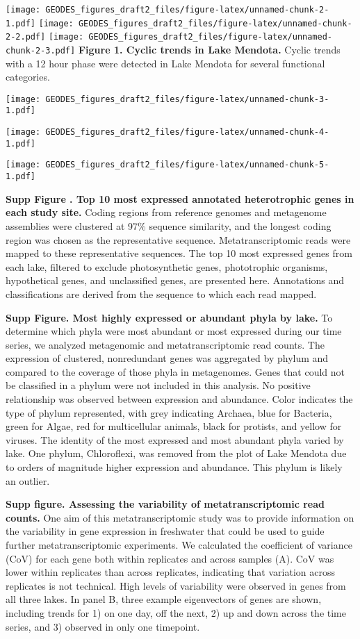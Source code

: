 \documentclass[]{article}
\begin{document}
\texttt{[image: GEODES\_figures\_draft2\_files/figure-latex/unnamed-chunk-2-1.pdf]}
\texttt{[image: GEODES\_figures\_draft2\_files/figure-latex/unnamed-chunk-2-2.pdf]}
\texttt{[image: GEODES\_figures\_draft2\_files/figure-latex/unnamed-chunk-2-3.pdf]}
\textbf{Figure 1. Cyclic trends in Lake Mendota.} Cyclic trends with a
12 hour phase were detected in Lake Mendota for several functional
categories.

\texttt{[image: GEODES\_figures\_draft2\_files/figure-latex/unnamed-chunk-3-1.pdf]}

\texttt{[image: GEODES\_figures\_draft2\_files/figure-latex/unnamed-chunk-4-1.pdf]}

\texttt{[image: GEODES\_figures\_draft2\_files/figure-latex/unnamed-chunk-5-1.pdf]}

\textbf{Supp Figure . Top 10 most expressed annotated heterotrophic
genes in each study site.} Coding regions from reference genomes and
metagenome assemblies were clustered at 97\% sequence similarity, and
the longest coding region was chosen as the representative sequence.
Metatranscriptomic reads were mapped to these representative sequences.
The top 10 most expressed genes from each lake, filtered to exclude
photosynthetic genes, phototrophic organisms, hypothetical genes, and
unclassified genes, are presented here. Annotations and classifications
are derived from the sequence to which each read mapped.

\textbf{Supp Figure. Most highly expressed or abundant phyla by lake.}
To determine which phyla were most abundant or most expressed during our
time series, we analyzed metagenomic and metatranscriptomic read counts.
The expression of clustered, nonredundant genes was aggregated by phylum
and compared to the coverage of those phyla in metagenomes. Genes that
could not be classified in a phylum were not included in this analysis.
No positive relationship was observed between expression and abundance.
Color indicates the type of phylum represented, with grey indicating
Archaea, blue for Bacteria, green for Algae, red for multicellular
animals, black for protists, and yellow for viruses. The identity of the
most expressed and most abundant phyla varied by lake. One phylum,
Chloroflexi, was removed from the plot of Lake Mendota due to orders of
magnitude higher expression and abundance. This phylum is likely an
outlier.

\textbf{Supp figure. Assessing the variability of metatranscriptomic
read counts.} One aim of this metatranscriptomic study was to provide
information on the variability in gene expression in freshwater that
could be used to guide further metatranscriptomic experiments. We
calculated the coefficient of variance (CoV) for each gene both within
replicates and across samples (A). CoV was lower within replicates than
across replicates, indicating that variation across replicates is not
technical. High levels of variability were observed in genes from all
three lakes. In panel B, three example eigenvectors of genes are shown,
including trends for 1) on one day, off the next, 2) up and down across
the time series, and 3) observed in only one timepoint.
\end{document}
